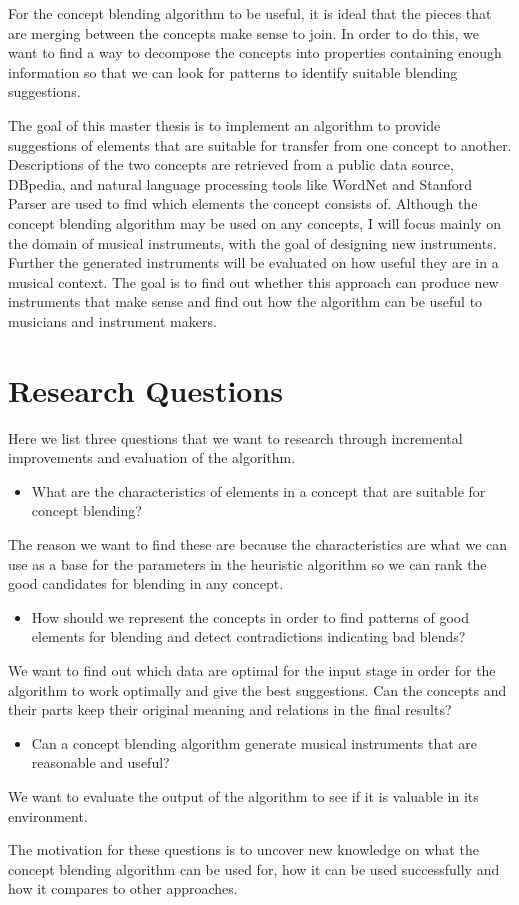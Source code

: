 For the concept blending algorithm to be useful, it is ideal that the pieces that are merging between the concepts make sense to join. In order to do this, we want to find a way to decompose the concepts into properties containing enough information so that we can look for patterns to identify suitable blending suggestions. %

The goal of this master thesis is to implement an algorithm to provide suggestions of elements that are suitable for transfer from one concept to another. Descriptions of the two concepts are retrieved from a public data source, DBpedia, and natural language processing tools like WordNet and Stanford Parser are used to find which elements the concept consists of. Although the concept blending algorithm may be used on any concepts, I will focus mainly on the domain of musical instruments, with the goal of designing new instruments. Further the generated instruments will be evaluated on how useful they are in a musical context. The goal is to find out whether this approach can produce new instruments that make sense and find out how the algorithm can be useful to musicians and instrument makers.


\section{Research Questions}
Here we list three questions that we want to research through incremental improvements and evaluation of the algorithm.
\begin{itemize}
\item What are the characteristics of elements in a concept that are suitable for concept blending?
\end{itemize}
The reason we want to find these are because the characteristics are what we can use as a base for the parameters in the heuristic algorithm so we can rank the good candidates for blending in any concept.
\begin{itemize}
\item How should we represent the concepts in order to find patterns of good elements for blending and detect contradictions indicating bad blends?
\end{itemize}
We want to find out which data are optimal for the input stage in order for the algorithm to work optimally and give the best suggestions. Can the concepts and their parts keep their original meaning and relations in the final results?
\begin{itemize}
\item Can a concept blending algorithm generate musical instruments that are reasonable and useful?
\end{itemize}
We want to evaluate the output of the algorithm to see if it is valuable in its environment.

The motivation for these questions is to uncover new knowledge on what the concept blending algorithm can be used for, how it can be used successfully and how it compares to other approaches.

